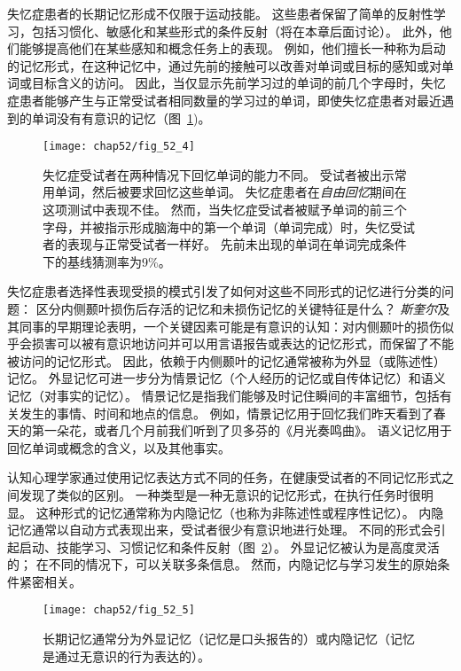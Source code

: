 失忆症患者的长期记忆形成不仅限于运动技能。
这些患者保留了简单的反射性学习，包括习惯化、敏感化和某些形式的条件反射（将在本章后面讨论）。
此外，他们能够提高他们在某些感知和概念任务上的表现。
例如，他们擅长一种称为启动的记忆形式，在这种记忆中，通过先前的接触可以改善对单词或目标的感知或对单词或目标含义的访问。
因此，当仅显示先前学习过的单词的前几个字母时，失忆症患者能够产生与正常受试者相同数量的学习过的单词，即使失忆症患者对最近遇到的单词没有有意识的记忆（图~\ref{fig:52_4})。


\begin{figure}[htbp]
	\centering
	\texttt{[image: chap52/fig\_52\_4]}
	\caption{失忆症受试者在两种情况下回忆单词的能力不同。
		受试者被出示常用单词，然后被要求回忆这些单词。
		失忆症患者在\textit{自由回忆}期间在这项测试中表现不佳。
		然而，当失忆症受试者被赋予单词的前三个字母，并被指示形成脑海中的第一个单词（单词完成）时，失忆受试者的表现与正常受试者一样好。
		先前未出现的单词在单词完成条件下的基线猜测率为9\%\cite{squire1987memory}。}
	\label{fig:52_4}
\end{figure}


失忆症患者选择性表现受损的模式引发了如何对这些不同形式的记忆进行分类的问题：
区分内侧颞叶损伤后存活的记忆和未损伤记忆的关键特征是什么？
\textit{斯奎尔}及其同事的早期理论表明，一个关键因素可能是有意识的认知：对内侧颞叶的损伤似乎会损害可以被有意识地访问并可以用言语报告或表达的记忆形式，而保留了不能被访问的记忆形式。
因此，依赖于内侧颞叶的记忆通常被称为外显（或陈述性）记忆。
外显记忆可进一步分为情景记忆（个人经历的记忆或自传体记忆）和语义记忆（对事实的记忆）。
情景记忆是指我们能够及时记住瞬间的丰富细节，包括有关发生的事情、时间和地点的信息。
例如，情景记忆用于回忆我们昨天看到了春天的第一朵花，或者几个月前我们听到了贝多芬的《月光奏鸣曲》。
语义记忆用于回忆单词或概念的含义，以及其他事实。


认知心理学家通过使用记忆表达方式不同的任务，在健康受试者的不同记忆形式之间发现了类似的区别。
一种类型是一种无意识的记忆形式，在执行任务时很明显。
这种形式的记忆通常称为内隐记忆（也称为非陈述性或程序性记忆）。
内隐记忆通常以自动方式表现出来，受试者很少有意识地进行处理。
不同的形式会引起启动、技能学习、习惯记忆和条件反射（图~\ref{fig:52_5}）。
外显记忆被认为是高度灵活的；
在不同的情况下，可以关联多条信息。
然而，内隐记忆与学习发生的原始条件紧密相关。


\begin{figure}[htbp]
	\centering
	\texttt{[image: chap52/fig\_52\_5]}
	\caption{长期记忆通常分为外显记忆（记忆是口头报告的）或内隐记忆（记忆是通过无意识的行为表达的）。}
	\label{fig:52_5}
\end{figure}


